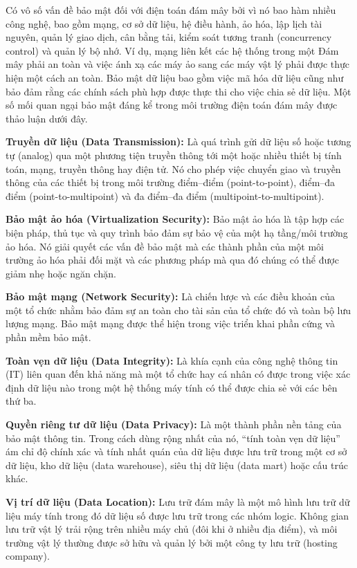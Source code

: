 Có vô số vấn đề bảo mật đối với điện toán đám mây bởi vì nó bao hàm nhiều công nghệ, bao gồm mạng, cơ sở dữ liệu, hệ điều hành, ảo hóa, lập lịch tài nguyên, quản lý giao dịch, cân bằng tải, kiểm soát tương tranh (concurrency control) và quản lý bộ nhớ. Ví dụ, mạng liên kết các hệ thống trong một Đám mây phải an toàn và việc ánh xạ các máy ảo sang các máy vật lý phải được thực hiện một cách an toàn. Bảo mật dữ liệu bao gồm việc mã hóa dữ liệu cũng như bảo đảm rằng các chính sách phù hợp được thực thi cho việc chia sẻ dữ liệu. Một số mối quan ngại bảo mật đáng kể trong môi trường điện toán đám mây được thảo luận dưới đây.

\textbf{Truyền dữ liệu (Data Transmission):} Là quá trình gửi dữ liệu số hoặc tương tự (analog) qua một phương tiện truyền thông tới một hoặc nhiều thiết bị tính toán, mạng, truyền thông hay điện tử. Nó cho phép việc chuyển giao và truyền thông của các thiết bị trong môi trường điểm--điểm (point-to-point), điểm--đa điểm (point-to-multipoint) và đa điểm--đa điểm (multipoint-to-multipoint).

\textbf{Bảo mật ảo hóa (Virtualization Security):} Bảo mật ảo hóa là tập hợp các biện pháp, thủ tục và quy trình bảo đảm sự bảo vệ của một hạ tầng/môi trường ảo hóa. Nó giải quyết các vấn đề bảo mật mà các thành phần của một môi trường ảo hóa phải đối mặt và các phương pháp mà qua đó chúng có thể được giảm nhẹ hoặc ngăn chặn.

\textbf{Bảo mật mạng (Network Security):} Là chiến lược và các điều khoản của một tổ chức nhằm bảo đảm sự an toàn cho tài sản của tổ chức đó và toàn bộ lưu lượng mạng. Bảo mật mạng được thể hiện trong việc triển khai phần cứng và phần mềm bảo mật.

\textbf{Toàn vẹn dữ liệu (Data Integrity):} Là khía cạnh của công nghệ thông tin (IT) liên quan đến khả năng mà một tổ chức hay cá nhân có được trong việc xác định dữ liệu nào trong một hệ thống máy tính có thể được chia sẻ với các bên thứ ba.

\textbf{Quyền riêng tư dữ liệu (Data Privacy):} Là một thành phần nền tảng của bảo mật thông tin. Trong cách dùng rộng nhất của nó, ``tính toàn vẹn dữ liệu'' ám chỉ độ chính xác và tính nhất quán của dữ liệu được lưu trữ trong một cơ sở dữ liệu, kho dữ liệu (data warehouse), siêu thị dữ liệu (data mart) hoặc cấu trúc khác.

\textbf{Vị trí dữ liệu (Data Location):} Lưu trữ đám mây là một mô hình lưu trữ dữ liệu máy tính trong đó dữ liệu số được lưu trữ trong các nhóm logic. Không gian lưu trữ vật lý trải rộng trên nhiều máy chủ (đôi khi ở nhiều địa điểm), và môi trường vật lý thường được sở hữu và quản lý bởi một công ty lưu trữ (hosting company).

